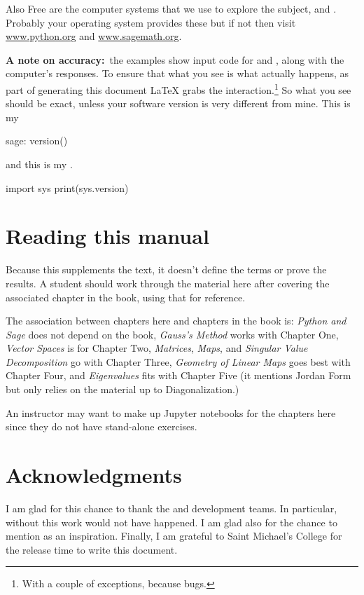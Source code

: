 Also Free are the computer systems that we use to explore the subject,
\python{} and \Sage{}.
Probably your operating system provides these but if not then visit 
\href{http://www.python.org}{\url{www.python.org}}
and 
\href{https://www.sagemath.org}{\url{www.sagemath.org}}.

\textbf{A note on accuracy:}~the examples 
show input code for \python{} and \Sage{}, 
along with the computer's responses.
To ensure that what you see is what actually happens,
as part of generating this 
document \LaTeX{} grabs the interaction.\footnote{%
  With a couple of exceptions, because bugs.}
So what you see should be exact,
unless your software version is very different from mine.
This is my \Sage
\begin{sagecommandline}
sage: version()  
\end{sagecommandline}
and this is my \python{}. 
\begin{pythonconsole}
import sys
print(sys.version)
\end{pythonconsole}




\section{Reading this manual}
Because this supplements the text, 
it doesn't define the terms or prove the results.
A student should work through the material here after covering the associated
chapter in the book, using that for reference.

The association between chapters here and chapters in the book is:
\textit{Python and Sage} does not depend on the
book,
\textit{Gauss’s Method} works with Chapter One,
\textit{Vector Spaces} is for Chapter Two,
\textit{Matrices}, 
\textit{Maps}, and 
\textit{Singular Value Decomposition} go with Chapter Three,
\textit{Geometry of Linear Maps} goes best with Chapter Four,
and \textit{Eigenvalues} fits with Chapter Five
(it mentions Jordan Form but only relies on the material up to 
Diagonalization.)

An instructor may want to make up Jupyter notebooks for the chapters here
since they do not have stand-alone exercises.




\section{Acknowledgments}
I am glad for this chance to thank the \python{} and
\Sage{} development teams.
In particular,
without \citep{SageTeam12ref} this work would not have happened.
I am glad also for the chance to mention 
\citep{Beezer11} as an inspiration.
Finally, I am grateful to Saint Michael's College for the 
release time to write this document.





